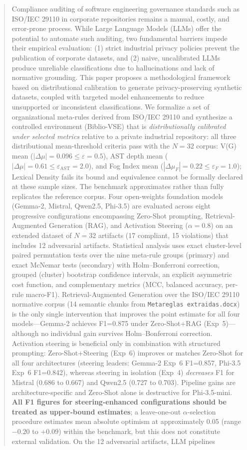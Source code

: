 \documentclass{ieeeaccess}
\begin{document}
\begin{abstract}
Compliance auditing of software engineering governance standards such as ISO/IEC 29110 in corporate repositories remains a manual, costly, and error-prone process. While Large Language Models (LLMs) offer the potential to automate such auditing, two fundamental barriers impede their empirical evaluation: (1) strict industrial privacy policies prevent the publication of corporate datasets, and (2) naive, uncalibrated LLMs produce unreliable classifications due to hallucinations and lack of normative grounding. This paper proposes a methodological framework based on distributional calibration to generate privacy-preserving synthetic datasets, coupled with targeted model enhancements to reduce unsupported or inconsistent classifications. We formalize a set of organizational meta-rules derived from ISO/IEC 29110 and synthesize a controlled environment (Biblio-VSE) that is \emph{distributionally calibrated under selected metrics} relative to a private industrial repository: all three distributional mean-threshold criteria pass with the $N=32$ corpus: V(G) mean ($|\Delta\mu|=0.096\leq\varepsilon=0.5$), AST depth mean ($|\Delta\mu|=0.61\leq\varepsilon_{\text{AST}}=2.0$), and Fog Index mean ($|\Delta\mu_F|=0.22\leq\varepsilon_F=1.0$); Lexical Density fails its bound and equivalence cannot be formally declared at these sample sizes. The benchmark approximates rather than fully replicates the reference corpus. Four open-weights foundation models (Gemma-2, Mistral, Qwen2.5, Phi-3.5) are evaluated across eight progressive configurations encompassing Zero-Shot prompting, Retrieval-Augmented Generation (RAG), and Activation Steering ($\alpha=0.8$) on an extended dataset of $N=32$ artifacts (17 compliant, 15 violations) that includes 12 adversarial artifacts. Statistical analysis uses exact cluster-level paired permutation tests over the nine meta-rule groups (primary) and exact McNemar tests (secondary) with Holm--Bonferroni correction, grouped (cluster) bootstrap confidence intervals, an explicit asymmetric cost function, and complementary metrics (MCC, balanced accuracy, per-rule macro-F1). Retrieval-Augmented Generation over the ISO/IEC 29110 normative corpus (14 semantic chunks from \texttt{Metareglas extraidas.docx}) is the only single intervention that improves the point estimate for all four models---Gemma-2 achieves F1=0.875 under Zero-Shot+RAG (Exp~5)---although no individual gain survives Holm--Bonferroni correction. Activation steering is beneficial only in combination with structured prompting: Zero-Shot+Steering (Exp~6) improves or matches Zero-Shot for all four architectures (steering leaders: Gemma-2 Exp~6 F1=0.857, Phi-3.5 Exp~6 F1=0.842), whereas steering in isolation (Exp~4) \emph{decreases} F1 for Mistral (0.686 to 0.667) and Qwen2.5 (0.727 to 0.703). Pipeline gains are architecture-specific and Zero-Shot alone is destructive for Phi-3.5-mini. \textbf{All F1 figures for steering-enhanced configurations should be treated as upper-bound estimates}; a leave-one-out $\alpha$-selection procedure estimates mean absolute optimism at approximately 0.05 (range $-0.20$ to $+0.09$) within the benchmark, but this does not constitute external validation. On the 12 adversarial artifacts, LLM pipelines 
\end{abstract}
\end{document}
